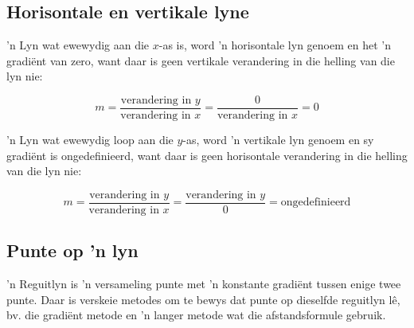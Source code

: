 \subsection*{Horisontale en vertikale lyne}

'n Lyn wat ewewydig aan die $x$-as is, word 'n horisontale lyn genoem en het 'n gradi\"ent van zero, want daar is geen vertikale verandering in die helling van die lyn nie:\par
\begin{equation*}
m = \dfrac{\mbox{verandering in }y}{\mbox{verandering in }x} = \dfrac{0}{\mbox{verandering in }x} =0
\end{equation*}


'n Lyn wat ewewydig loop aan die $y$-as, word 'n vertikale lyn genoem en sy gradi\"ent is ongedefinieerd, want daar is geen horisontale verandering in die helling van die lyn nie:\par
\begin{equation*}
 m = \dfrac{\mbox{verandering in }y}{\mbox{verandering in }x} = \dfrac{\mbox{verandering in }y}{0}= \mbox{ongedefinieerd}
\end{equation*}


\subsection*{Punte op 'n lyn}

'n Reguitlyn is 'n versameling punte met 'n konstante gradi\"ent tussen enige twee punte. Daar is verskeie metodes om te bewys dat punte op dieselfde reguitlyn l\^e, bv. die gradi\"ent metode en 'n langer metode wat die afstandsformule gebruik. 

